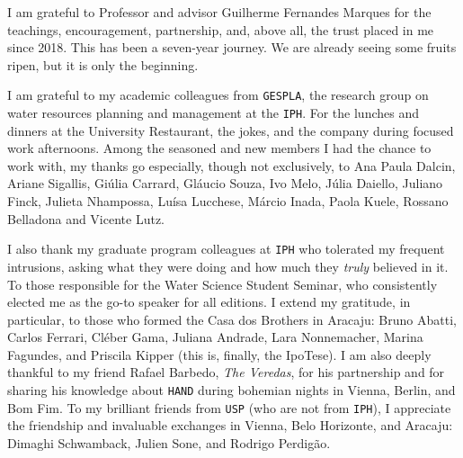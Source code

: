 \documentclass[./main_en.tex]{subfiles}
\begin{document}
\doublespacing %
\large

\newpage
\renewcommand{\headrulewidth}{0pt}
\thispagestyle{fancy}
\fancyhf{} %
\fancyfoot{} %
\fancyfoot[C]{\thepage}

\begin{center}
    \vspace{1mm}
\end{center}
\singlespacing
\normalsize

\setlength{\parskip}{\myparskip}

\par I am grateful to Professor and advisor Guilherme Fernandes Marques for the teachings, encouragement, partnership, and, above all, the trust placed in me since 2018. This has been a seven-year journey. We are already seeing some fruits ripen, but it is only the beginning.

\par I am grateful to my academic colleagues from \texttt{GESPLA}, the research group on water resources planning and management at the \texttt{IPH}. For the lunches and dinners at the University Restaurant, the jokes, and the company during focused work afternoons. Among the seasoned and new members I had the chance to work with, my thanks go especially, though not exclusively, to Ana Paula Dalcin, Ariane Sigallis, Giúlia Carrard, Gláucio Souza, Ivo Melo, Júlia Daiello, Juliano Finck, Julieta Nhampossa, Luísa Lucchese, Márcio Inada, Paola Kuele, Rossano Belladona and Vicente Lutz.

\par I also thank my graduate program colleagues at \texttt{IPH} who tolerated my frequent intrusions, asking what they were doing and how much they \textit{truly} believed in it. To those responsible for the Water Science Student Seminar, who consistently elected me as the go-to speaker for all editions. I extend my gratitude, in particular, to those who formed the Casa dos Brothers in Aracaju: Bruno Abatti, Carlos Ferrari, Cléber Gama, Juliana Andrade, Lara Nonnemacher, Marina Fagundes, and Priscila Kipper (this is, finally, the IpoTese). I am also deeply thankful to my friend Rafael Barbedo, \textit{The Veredas}, for his partnership and for sharing his knowledge about \texttt{HAND} during bohemian nights in Vienna, Berlin, and Bom Fim. To my brilliant friends from \texttt{USP} (who are not from \texttt{IPH}), I appreciate the friendship and invaluable exchanges in Vienna, Belo Horizonte, and Aracaju: Dimaghi Schwamback, Julien Sone, and Rodrigo Perdigão.
\end{document}
